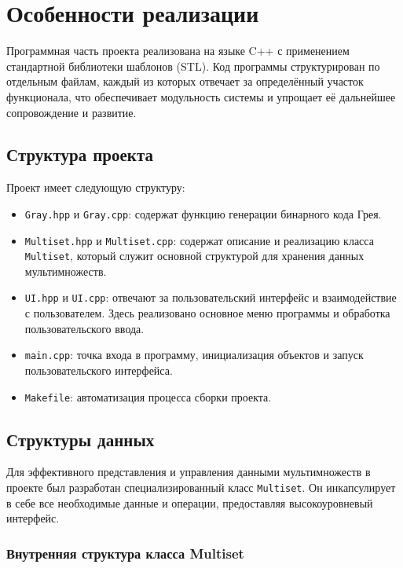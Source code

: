 \section{Особенности реализации}

Программная часть проекта реализована на языке C++ с применением стандартной библиотеки шаблонов (STL). Код программы структурирован по отдельным файлам, каждый из которых отвечает за определённый участок функционала, что обеспечивает модульность системы и упрощает её дальнейшее сопровождение и развитие.

\subsection{Структура проекта}
Проект имеет следующую структуру:
\begin{itemize}
    \item \texttt{Gray.hpp} и \texttt{Gray.cpp}: содержат функцию генерации бинарного кода Грея.
    \item \texttt{Multiset.hpp} и \texttt{Multiset.cpp}: содержат описание и реализацию класса \texttt{Multiset}, который служит основной структурой для хранения данных мультимножеств.
    \item \texttt{UI.hpp} и \texttt{UI.cpp}: отвечают за пользовательский интерфейс и взаимодействие с пользователем. Здесь реализовано основное меню программы и обработка пользовательского ввода.
    \item \texttt{main.cpp}: точка входа в программу, инициализация объектов и запуск пользовательского интерфейса.
    \item \texttt{Makefile}: автоматизация процесса сборки проекта.
\end{itemize}

\subsection{Структуры данных}

Для эффективного представления и управления данными мультимножеств в проекте был разработан специализированный класс \texttt{Multiset}. Он инкапсулирует в себе все необходимые данные и операции, предоставляя высокоуровневый интерфейс.

\subsubsection{Внутренняя структура класса Multiset}

